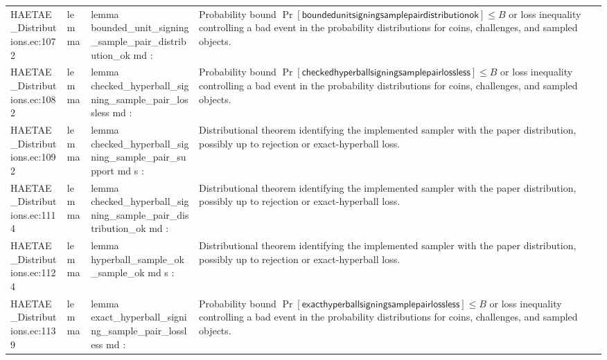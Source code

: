 \documentclass[10pt]{article}
\begin{document}
\begin{longtable}{L{0.11\textwidth}L{0.055\textwidth}L{0.385\textwidth}L{0.41\textwidth}}
HAETAE\_\allowbreak{}Distributions.\allowbreak{}ec:\allowbreak{}1072 & lemma & {\ttfamily\scriptsize lemma bounded\_\allowbreak{}unit\_\allowbreak{}signing\_\allowbreak{}sample\_\allowbreak{}pair\_\allowbreak{}distribution\_\allowbreak{}ok md :} & Probability bound $\Pr[\mathsf{boundedunitsigningsamplepairdistributionok}]\le B$ or loss inequality controlling a bad event in the probability distributions for coins, challenges, and sampled objects. \\
HAETAE\_\allowbreak{}Distributions.\allowbreak{}ec:\allowbreak{}1082 & lemma & {\ttfamily\scriptsize lemma checked\_\allowbreak{}hyperball\_\allowbreak{}signing\_\allowbreak{}sample\_\allowbreak{}pair\_\allowbreak{}lossless md :} & Probability bound $\Pr[\mathsf{checkedhyperballsigningsamplepairlossless}]\le B$ or loss inequality controlling a bad event in the probability distributions for coins, challenges, and sampled objects. \\
HAETAE\_\allowbreak{}Distributions.\allowbreak{}ec:\allowbreak{}1092 & lemma & {\ttfamily\scriptsize lemma checked\_\allowbreak{}hyperball\_\allowbreak{}signing\_\allowbreak{}sample\_\allowbreak{}pair\_\allowbreak{}support md s :} & Distributional theorem identifying the implemented sampler with the paper distribution, possibly up to rejection or exact-hyperball loss. \\
HAETAE\_\allowbreak{}Distributions.\allowbreak{}ec:\allowbreak{}1114 & lemma & {\ttfamily\scriptsize lemma checked\_\allowbreak{}hyperball\_\allowbreak{}signing\_\allowbreak{}sample\_\allowbreak{}pair\_\allowbreak{}distribution\_\allowbreak{}ok md :} & Distributional theorem identifying the implemented sampler with the paper distribution, possibly up to rejection or exact-hyperball loss. \\
HAETAE\_\allowbreak{}Distributions.\allowbreak{}ec:\allowbreak{}1124 & lemma & {\ttfamily\scriptsize lemma hyperball\_\allowbreak{}sample\_\allowbreak{}ok\_\allowbreak{}sample\_\allowbreak{}ok md s :} & Distributional theorem identifying the implemented sampler with the paper distribution, possibly up to rejection or exact-hyperball loss. \\
HAETAE\_\allowbreak{}Distributions.\allowbreak{}ec:\allowbreak{}1139 & lemma & {\ttfamily\scriptsize lemma exact\_\allowbreak{}hyperball\_\allowbreak{}signing\_\allowbreak{}sample\_\allowbreak{}pair\_\allowbreak{}lossless md :} & Probability bound $\Pr[\mathsf{exacthyperballsigningsamplepairlossless}]\le B$ or loss inequality controlling a bad event in the probability distributions for coins, challenges, and sampled objects. \\

\end{longtable}
\end{document}
